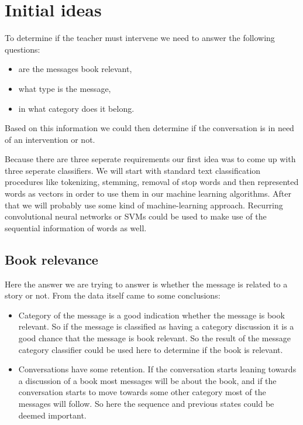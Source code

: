 \documentclass[11pt,a4paper]{article}
\begin{document}
\section{Initial ideas}

To determine if the teacher must intervene we need to answer the following questions:
\begin{itemize}
\item{are the messages book relevant,}
\item{what type is the message,}
\item{in what category does it belong.}
\end{itemize}

Based on this information we could then determine if the conversation is in need of an intervention or not.

Because there are three seperate requirements our first idea was to come up with three seperate classifiers.
We will start with standard text classification procedures like tokenizing, stemming, removal of stop words and then represented words as vectors in order to use them in our machine learning algorithms.
After that we will probably use some kind of machine-learning approach. 
Recurring convolutional neural networks or SVMs could be used to make use of the sequential information of words as well.

\subsection{Book relevance}
Here the answer we are trying to answer is whether the message is related to a story or not.
From the data itself came to some conclusions:

\begin{itemize}
\item{Category of the message is a good indication whether the message is book relevant. 
So if the message is classified as having a category discussion it is a good chance that the message is book relevant.
So the result of the message category classifier could be used here to determine if the book is relevant.}
\item{Conversations have some retention.
If the conversation starts leaning towards a discussion of a book most messages will be about the book, and if the conversation starts to move towards some other category most of the messages will follow.
So here the sequence and previous states could be deemed important.}
\end{itemize}
\end{document}
